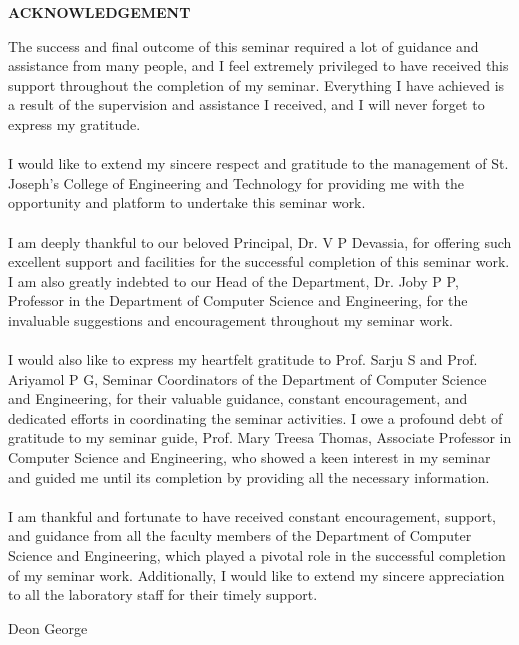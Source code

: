 \newpage
\thispagestyle{empty}
\begin{center}
  \vspace*{1cm}
  \textbf{\large ACKNOWLEDGEMENT}
\end{center}
The success and final outcome of this seminar required a lot of guidance and assistance from
many people, and I feel extremely privileged to have received this support throughout the
completion of my seminar. Everything I have achieved is a result of the supervision and
assistance I received, and I will never forget to express my gratitude.
\\[-0.3cm]
\\I would like to extend my sincere respect and gratitude to the management of St. Joseph’s
College of Engineering and Technology for providing me with the opportunity and platform
to undertake this seminar work.
\\[-0.3cm]
\\I am deeply thankful to our beloved Principal, Dr. V P Devassia, for offering such excellent
support and facilities for the successful completion of this seminar work.
I am also greatly indebted to our Head of the Department, Dr. Joby P P, Professor in the Department of Computer Science and Engineering, for the invaluable suggestions and encouragement throughout my seminar work.
\\[-0.3cm]
\\I would also like to express my heartfelt gratitude to Prof. Sarju S and Prof. Ariyamol P G, Seminar Coordinators of the Department of Computer Science and Engineering, for their valuable guidance, constant encouragement, and dedicated efforts in coordinating the seminar activities. I owe a profound debt of gratitude to my seminar guide, Prof. Mary Treesa Thomas,
Associate Professor in Computer Science and Engineering,
who showed a keen interest in my seminar and guided me until its completion by providing
all the necessary information.
\\[-0.3cm]
\\I am thankful and fortunate to have received constant encouragement, support, and guidance
from all the faculty members of the Department of Computer Science and Engineering, which
played a pivotal role in the successful completion of my seminar work. Additionally, I would
like to extend my sincere appreciation to all the laboratory staff for their timely support.
\\
\begin{flushright}
    Deon George
\end{flushright}


